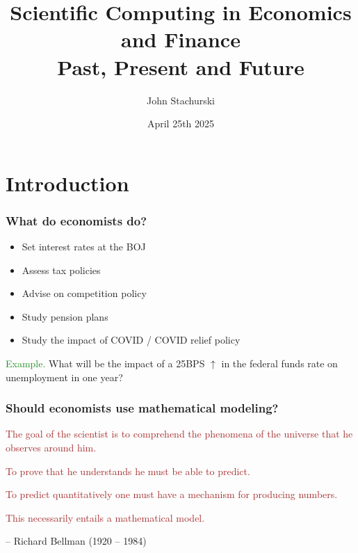 \documentclass[
    xcolor={svgnames,dvipsnames},
    hyperref={colorlinks, citecolor=DeepPink4, linkcolor=DarkRed, urlcolor=DarkBlue}
    ]{beamer}  %
\title{Scientific Computing in Economics and Finance\\
    Past, Present and Future}
\author{John Stachurski}
\institute{Tokyo College and Australian National University}
\date{April 25th 2025}
\newcommand{\Eg}{\textcolor{ForestGreen}{Example. }}
\newcommand{\brown}[1]{\textcolor{Brown}{\sf #1}}
\newcommand{\1}{\mathbbm 1}
\begin{document}
\begin{frame}
  \titlepage
\end{frame}





\section{Introduction}



\begin{frame}
    \frametitle{What do economists do?}

    \begin{itemize}
        \item Set interest rates at the BOJ
            \vspace{0.3em}
        \item Assess tax policies
            \vspace{0.3em}
        \item Advise on competition policy 
            \vspace{0.3em}
        \item Study pension plans
            \vspace{0.3em}
        \item Study the impact of COVID / COVID relief policy
    \end{itemize}

            \vspace{0.3em}
            \vspace{0.3em}

    \Eg What will be the impact of a 25BPS $\uparrow$ in the federal funds
    rate on unemployment in one year?

\end{frame}


\begin{frame}
    \frametitle{Should economists use mathematical modeling?}

    \pause

    \brown{The goal of the scientist is to comprehend the phenomena of the
    universe that he observes around him.}

            \vspace{0.3em}
    \brown{To prove that he understands he must be able to predict.}

            \vspace{0.3em}
    \brown{To predict quantitatively one must have a mechanism for producing
    numbers.}

            \vspace{0.3em}
    \brown{This necessarily entails a mathematical model.}

            \vspace{0.3em}
            \vspace{0.3em}
            \vspace{0.3em}
     -- Richard Bellman (1920 -- 1984)

\end{frame}
\end{document}
